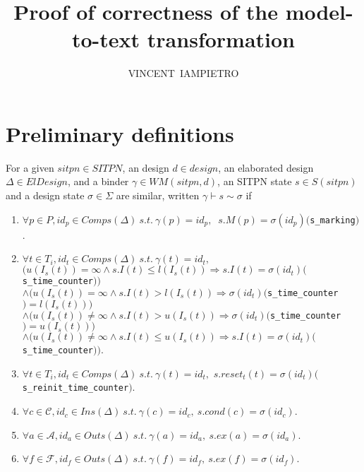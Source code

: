 \documentclass[dvipsnames,12pt]{article}
\title{Proof of correctness of the \hilecop{} model-to-text
  transformation}
\author{VINCENT~IAMPIETRO%
}
\begin{document}





\section{Preliminary definitions}
\label{sec:prelim-defs}

\begin{definition}
  \label{def:state-sim}
  For a given $sitpn\in{}SITPN$, an \hvhdl{} design $d\in{}design$, an
  elaborated design $\Delta\in{}ElDesign$, and a binder
  $\gamma\in{}WM(sitpn,d)$, an SITPN state $s\in{}S(sitpn)$ and a
  design state $\sigma\in\Sigma$ are similar, written
  $\gamma\vdash{}s\sim\sigma$ if
  \begin{enumerate}
  \item\label{item:sim-mark} $\forall{}p\in{}P,id_p\in{}Comps(\Delta)~s.t.~\gamma(p)=id_p,$
    $~s.M(p)=\sigma(id_p)($\texttt{s\_marking}$)$.
  \item\label{item:sim-tc}
    $\forall{}t\in{}T_i,id_t\in{}Comps(\Delta)~s.t.~\gamma(t)=id_t,$\\
    $\big(u(I_s(t))=\infty\land{}s.I(t)\le{}l(I_s(t))\Rightarrow{}s.I(t)=\sigma(id_t)($\texttt{s\_time\_counter}$)\big)$\\
    $\land\big(u(I_s(t))=\infty\land{}s.I(t)>{}l(I_s(t))\Rightarrow{}\sigma(id_t)($\texttt{s\_time\_counter}$)=l(I_s(t))\big)$\\
    $\land\big(u(I_s(t))\neq\infty\land{}s.I(t)>{}u(I_s(t))\Rightarrow{}\sigma(id_t)($\texttt{s\_time\_counter}$)=u(I_s(t))\big)$\\
    $\land\big(u(I_s(t))\neq\infty\land{}s.I(t)\le{}u(I_s(t))\Rightarrow{}s.I(t)=\sigma(id_t)($\texttt{s\_time\_counter}$)\big)$.
  \item\label{item:sim-reset}
    $\forall{}t\in{}T_i,id_t\in{}Comps(\Delta)~s.t.~\gamma(t)=id_t,$
    $s.reset_t(t)=\sigma(id_t)($\texttt{s\_reinit\_time\_counter}$)$.
  \item\label{item:sim-cond}
    $\forall{}c\in\mathcal{C},id_c\in{}Ins(\Delta)~s.t.~\gamma(c)=id_c,~s.cond(c)=\sigma(id_c)$.
  \item\label{item:sim-act}
    $\forall{}a\in\mathcal{A},id_a\in{}Outs(\Delta)~s.t.~\gamma(a)=id_a,~s.ex(a)=\sigma(id_a)$.
  \item\label{item:sim-fun}
    $\forall{}f\in\mathcal{F},id_f\in{}Outs(\Delta)~s.t.~\gamma(f)=id_f,~s.ex(f)=\sigma(id_f)$.
  \end{enumerate}
\end{definition}
\end{document}
